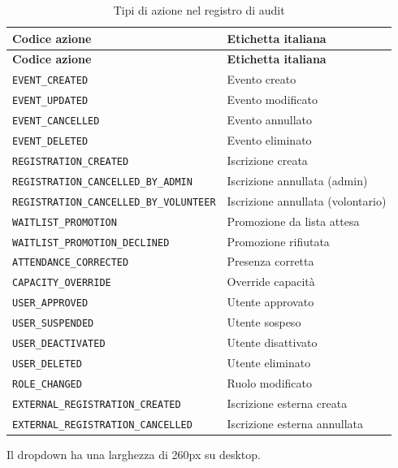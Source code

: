 \documentclass[a4paper,11pt,oneside]{book}
\begin{document}
\begin{longtable}{l l}
\caption{Tipi di azione nel registro di audit} \label{tab:tipi-azione-audit} \\
\toprule
\textbf{Codice azione} & \textbf{Etichetta italiana} \\
\midrule
\endfirsthead
\toprule
\textbf{Codice azione} & \textbf{Etichetta italiana} \\
\midrule
\endhead
\texttt{EVENT\_CREATED}                     & Evento creato \\
\texttt{EVENT\_UPDATED}                     & Evento modificato \\
\texttt{EVENT\_CANCELLED}                   & Evento annullato \\
\texttt{EVENT\_DELETED}                     & Evento eliminato \\
\texttt{REGISTRATION\_CREATED}              & Iscrizione creata \\
\texttt{REGISTRATION\_CANCELLED\_BY\_ADMIN} & Iscrizione annullata (admin) \\
\texttt{REGISTRATION\_CANCELLED\_BY\_VOLUNTEER} & Iscrizione annullata (volontario) \\
\texttt{WAITLIST\_PROMOTION}                & Promozione da lista attesa \\
\texttt{WAITLIST\_PROMOTION\_DECLINED}      & Promozione rifiutata \\
\texttt{ATTENDANCE\_CORRECTED}              & Presenza corretta \\
\texttt{CAPACITY\_OVERRIDE}                 & Override capacit\`a \\
\texttt{USER\_APPROVED}                     & Utente approvato \\
\texttt{USER\_SUSPENDED}                    & Utente sospeso \\
\texttt{USER\_DEACTIVATED}                  & Utente disattivato \\
\texttt{USER\_DELETED}                      & Utente eliminato \\
\texttt{ROLE\_CHANGED}                      & Ruolo modificato \\
\texttt{EXTERNAL\_REGISTRATION\_CREATED}    & Iscrizione esterna creata \\
\texttt{EXTERNAL\_REGISTRATION\_CANCELLED}  & Iscrizione esterna annullata \\
\bottomrule
\end{longtable}

Il dropdown ha una larghezza di 260px su desktop.
\end{document}
